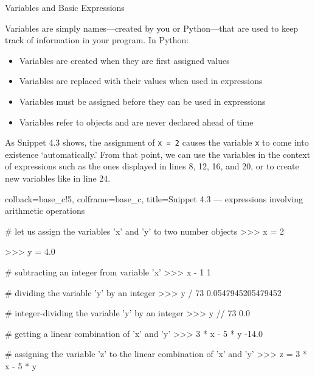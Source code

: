 \documentclass[a4paper,11pt]{book}
\numberwithin{figure}{chapter}
\numberwithin{table}{chapter}
\newcommand{\question}[1]{%
    \begin{tcolorbox}[colback=comp_c!10,colframe=comp_c,sidebyside align=top,width=\linewidth,before skip=1ex]
        #1
    \end{tcolorbox}%
    \switchcolumn%
}
\newcommand{\note}[1]{%
    \begin{tcolorbox}[colback=white!0,colframe=white!10,width=\linewidth,before skip=1ex]
        #1
    \end{tcolorbox}         
}
\begin{document}
\begin{paracol}{2}
	\question{\raggedright Variables and Basic Expressions}
	\note{Variables are simply names—created by you or Python—that are used to keep track of information in your program. In Python:
	\begin{itemize}
		\item Variables are created when they are first assigned values
		\item Variables are replaced with their values when used in expressions
		\item Variables must be assigned before they can be used in expressions
		\item Variables refer to objects and are never declared ahead of time
	\end{itemize}
    As Snippet 4.3 shows, the assignment of \texttt{x = 2} causes the variable \texttt{x} to come into existence `automatically.' From that point, we can use the variables in the context of expressions such as the ones displayed in lines 8, 12, 16, and 20, or to create new variables like in line 24.
    }
\end{paracol}

\begin{pythoncode}[linenos=true,]{colback=base_c!5, colframe=base_c, title=\sffamily Snippet 4.3 --- expressions involving arithmetic operations}
	
# let us assign the variables 'x' and 'y' to two number objects
>>> x = 2

>>> y = 4.0	

# subtracting an integer from variable 'x'
>>> x - 1
1

# dividing the variable 'y' by an integer
>>> y / 73
0.0547945205479452

# integer-dividing the variable 'y' by an integer
>>> y // 73
0.0

# getting a linear combination of 'x' and 'y'
>>> 3 * x - 5 * y
-14.0

# assigning the variable 'z' to the linear combination of 'x' and 'y'
>>> z = 3 * x - 5 * y

\end{pythoncode}
\end{document}
